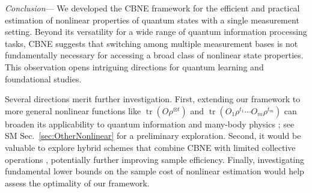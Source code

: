 \documentclass[aps,prl,twocolumn,nofootinbib,superscriptaddress,10pt]{revtex4-2}
\DeclareMathOperator{\Tr}{tr}
\newcommand{\red}[1]{{\leavevmode\color{red}#1}}
\theoremstyle{plain}
\theoremstyle{definition}
\begin{document}









\emph{Conclusion}---
We developed the CBNE framework for the efficient and practical estimation of nonlinear properties of quantum states with a single measurement setting. 
Beyond its versatility for a wide range of quantum information processing tasks, CBNE suggests that switching among multiple measurement bases is not fundamentally necessary for accessing a broad class of nonlinear state properties. 
This observation opens intriguing directions for quantum learning and foundational studies.


Several directions merit further investigation. 
First, extending our framework to more general nonlinear functions like $\Tr(O\rho^{\otimes t})$ and $\Tr(O_1\rho^{t_1}\cdots O_m\rho^{t_m})$ can broaden its applicability to quantum information and many-body physics \cite{PRXQuantum.5.030338,PhysRevLett.127.260501,zhou2024hybrid}; see SM Sec.~\ref{sec:OtherNonlinear} for a preliminary exploration.  
Second, it would be valuable to explore hybrid schemes that combine CBNE with limited collective operations \cite{PRXQuantum.6.010336,chen2024optimal}, potentially further improving sample efficiency. 
Finally, investigating fundamental lower bounds on the sample cost of nonlinear estimation %
\cite{anshu2022distributed,chen2022exponential,gong2024sample} would help assess the optimality of our framework.
\end{document}
